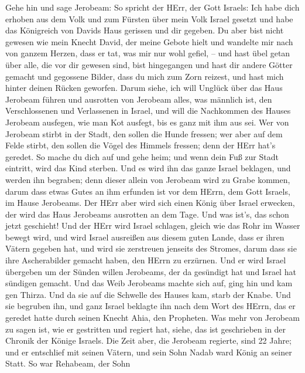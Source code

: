  Gehe hin und sage Jerobeam: So spricht der HErr, der Gott
Israels: Ich habe dich erhoben aus dem Volk und zum Fürsten über mein
Volk Israel gesetzt  und habe das Königreich von Davids Haus
gerissen und dir gegeben. Du aber bist nicht gewesen wie mein Knecht
David, der meine Gebote hielt und wandelte mir nach von ganzem Herzen,
dass er tat, was mir nur wohl gefiel, --  und hast übel
getan über alle, die vor dir gewesen sind, bist hingegangen und hast dir
andere Götter gemacht und gegossene Bilder, dass du mich zum Zorn
reizest, und hast mich hinter deinen Rücken geworfen. 
Darum siehe, ich will Unglück über das Haus Jerobeam führen und
ausrotten von Jerobeam alles, was männlich ist, den Verschlossenen und
Verlassenen in Israel, und will die Nachkommen des Hauses Jerobeam
ausfegen, wie man Kot ausfegt, bis es ganz mit ihm aus sei.
 Wer von Jerobeam stirbt in der Stadt, den sollen die Hunde
fressen; wer aber auf dem Felde stirbt, den sollen die Vögel des Himmels
fressen; denn der HErr hat's geredet.  So mache du dich auf
und gehe heim; und wenn dein Fuß zur Stadt eintritt, wird das Kind
sterben.  Und es wird ihn das ganze Israel beklagen, und
werden ihn begraben; denn dieser allein von Jerobeam wird zu Grabe
kommen, darum dass etwas Gutes an ihm erfunden ist vor dem HErrn, dem
Gott Israels, im Hause Jerobeams.  Der HErr aber wird sich
einen König über Israel erwecken, der wird das Haus Jerobeams ausrotten
an dem Tage. Und was ist's, das schon jetzt geschieht!  Und
der HErr wird Israel schlagen, gleich wie das Rohr im Wasser bewegt
wird, und wird Israel ausreißen aus diesem guten Lande, dass er ihren
Vätern gegeben hat, und wird sie zerstreuen jenseits des Stromes, darum
dass sie ihre Ascherabilder gemacht haben, den HErrn zu erzürnen.
 Und er wird Israel übergeben um der Sünden willen
Jerobeams, der da gesündigt hat und Israel hat sündigen gemacht.
 Und das Weib Jerobeams machte sich auf, ging hin und kam
gen Thirza. Und da sie auf die Schwelle des Hauses kam, starb der Knabe.
 Und sie begruben ihn, und ganz Israel beklagte ihn nach
dem Wort des HErrn, das er geredet hatte durch seinen Knecht Ahia, den
Propheten.  Was mehr von Jerobeam zu sagen ist, wie er
gestritten und regiert hat, siehe, das ist geschrieben in der Chronik
der Könige Israels.  Die Zeit aber, die Jerobeam regierte,
sind 22 Jahre; und er entschlief mit seinen Vätern, und sein Sohn Nadab
ward König an seiner Statt.  So war Rehabeam, der Sohn
